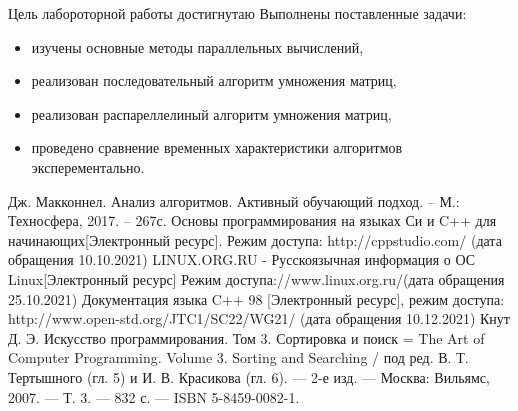 \documentclass[12pt,a4paper]{report}
\begin{document}
Цель лабороторной работы достигнутаю Выполнены поставленные задачи:

\begin{itemize}
	\item изучены основные методы параллельных вычислений,
	\item реализован последовательный алгоритм умножения матриц,
	\item реализован распареллелиный алгоритм умножения матриц,
	\item проведено сравнение временных характеристики алгоритмов эксперементально.
\end{itemize}

\newpage
\renewcommand\bibname{Список литературы}
\makeatletter %
\def\@biblabel#1{#1. }
\makeatother
\begin{thebibliography}{2}
     Дж. Макконнел. Анализ алгоритмов. Активный обучающий подход. -- М.: Техносфера, 2017. -- 267с.
    Основы программирования на языках Си и C++ для начинающих[Электронный ресурс]. Режим доступа: http://cppstudio.com/ (дата обращения 10.10.2021)
    LINUX.ORG.RU - Русскоязычная информация о ОС Linux[Электронный ресурс] Режим доступа://www.linux.org.ru/(дата обращения 25.10.2021)
      Документация языка C++ 98 [Электронный ресурс], режим доступа: http://www.open-std.org/JTC1/SC22/WG21/ (дата обращения 10.12.2021)
    Кнут Д. Э. Искусство программирования. Том 3. Сортировка и поиск = The Art of Computer Programming. Volume 3. Sorting and Searching / под ред. В. Т. Тертышного (гл. 5) и И. В. Красикова (гл. 6). — 2-е изд. — Москва: Вильямс, 2007. — Т. 3. — 832 с. — ISBN 5-8459-0082-1.
\end{thebibliography}
\end{document}

